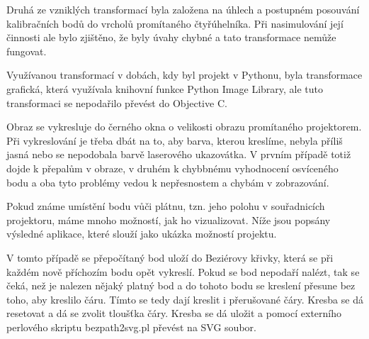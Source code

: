 \documentclass[twoside,12pt]{article}
\begin{document}
Druhá ze vzniklých transformací byla založena na úhlech a postupném posouvání kalibračních bodů do vrcholů promítaného čtyřúhelníka. Při nasimulování její činnosti ale bylo zjištěno, že byly úvahy chybné a tato transformace nemůže fungovat.

Využívanou transformací v dobách, kdy byl projekt v Pythonu, byla transformace grafická, která využívala knihovní funkce Python Image Library, ale tuto transformaci se nepodařilo převést do Objective C.

Obraz se vykresluje do černého okna o velikosti obrazu promítaného projektorem. Při vykreslování je třeba dbát na to, aby barva, kterou kreslíme, nebyla příliš jasná nebo se nepodobala barvě laserového ukazovátka. V prvním případě totiž dojde k přepalům v obraze, v druhém k chybbnému vyhodnocení osvíceného bodu a oba tyto problémy vedou k nepřesnostem a chybám v zobrazování.


Pokud známe umístění bodu vůči plátnu, tzn. jeho polohu v souřadnicích projektoru, máme mnoho možností, jak ho vizualizovat. Níže jsou popsány výsledné aplikace, které slouží jako ukázka možností projektu.

V tomto případě se přepočítaný bod uloží do Beziérovy křivky, která se při každém nově příchozím bodu opět vykreslí. Pokud se bod nepodaří nalézt, tak se čeká, než je nalezen nějaký platný bod a do tohoto bodu se kreslení přesune bez toho, aby kreslilo čáru. Tímto se tedy dají kreslit i přerušované čáry. Kresba se dá resetovat a dá se zvolit tloušťka čáry. Kresba se dá uložit a pomocí externího perlového skriptu bezpath2svg.pl převést na SVG soubor.
\end{document}
